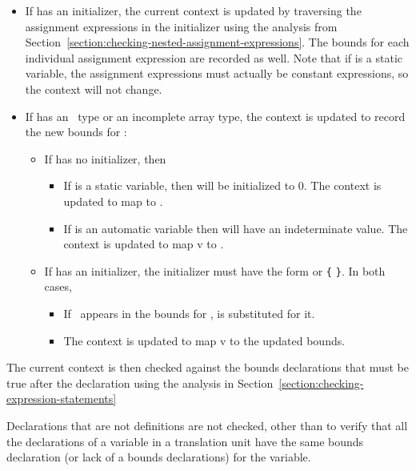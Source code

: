 \begin{itemize}
\item
  If  has an initializer, the current context is updated by
  traversing the assignment expressions in the initializer using the
  analysis from Section~\ref{section:checking-nested-assignment-expressions}. 
  The bounds for each individual assignment
  expression are recorded as well. Note that if  is a static
  variable, the assignment expressions must actually be constant
  expressions, so the context will not change.
\item
  If  has an \arrayptr\ type or an incomplete array
  type, the context is updated to record the new bounds for :

  \begin{itemize}
  \item
    If  has no initializer, then

    \begin{itemize}
    \item
      If  is a static variable, then  will be
      initialized to 0. The context is updated to map  to
      \boundsany.
    \item
      If  is an automatic variable then  will have an
      indeterminate value. The context is updated to map v to
      \boundsnone.
    \end{itemize}
  \item
    If  has an initializer, the initializer must have the form
     or \texttt{\{}  \texttt{\}}. In both cases,

    \begin{itemize}
    \item
      If \exprcurrentvalue\ appears in the bounds for
      ,  is substituted for it.
    \item
      The context is updated to map v to the updated bounds.
    \end{itemize}
  \end{itemize}
\end{itemize}

The current context is then checked against the bounds declarations that
must be true after the declaration using the analysis in 
Section~\ref{section:checking-expression-statements}

Declarations that are not definitions are not checked, other than to
verify that all the declarations of a variable in a translation unit
have the same bounds declaration (or lack of a bounds declarations) for
the variable.

